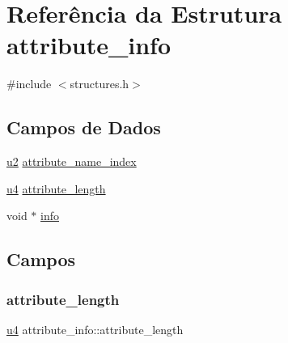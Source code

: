 \hypertarget{structattribute__info}{}\section{Referência da Estrutura attribute\+\_\+info}
\label{structattribute__info}


{\ttfamily \#include $<$structures.\+h$>$}

\subsection*{Campos de Dados}
\begin{DoxyCompactItemize}
\item 
\hyperlink{lista__operandos_8h_a732cde1300aafb73b0ea6c2558a7a54f}{u2} \hyperlink{structattribute__info_a19df9d4b42eb55ca5dc1bed98df89378}{attribute\+\_\+name\+\_\+index}
\item 
\hyperlink{lista__operandos_8h_ae5be1f726785414dd1b77d60df074c9d}{u4} \hyperlink{structattribute__info_a1ed8f679458c4bb0ed3315721588f50d}{attribute\+\_\+length}
\item 
void $\ast$ \hyperlink{structattribute__info_a7f168925308e418b7b44c9f11fdf42ae}{info}
\end{DoxyCompactItemize}


\subsection{Campos}
\mbox{\label{structattribute__info_a1ed8f679458c4bb0ed3315721588f50d}} 
\subsubsection{\texorpdfstring{attribute\+\_\+length}{attribute\_length}}
{\footnotesize\ttfamily \hyperlink{lista__operandos_8h_ae5be1f726785414dd1b77d60df074c9d}{u4} attribute\+\_\+info\+::attribute\+\_\+length}

\mbox{\label{structattribute__info_a19df9d4b42eb55ca5dc1bed98df89378}} 
